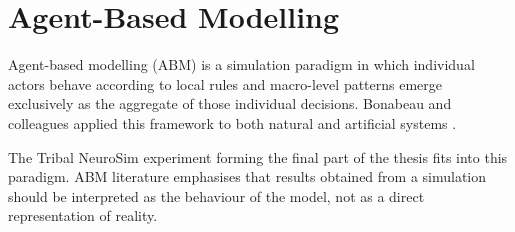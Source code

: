 \section{Agent-Based Modelling}

Agent-based modelling (ABM) is a simulation paradigm in which individual actors behave according to local rules and macro-level patterns emerge exclusively as the aggregate of those individual decisions. Bonabeau and colleagues applied this framework to both natural and artificial systems \cite{bonabeau2002}.

The Tribal NeuroSim experiment forming the final part of the thesis fits into this paradigm. ABM literature emphasises that results obtained from a simulation should be interpreted as the behaviour of the model, not as a direct representation of reality.
